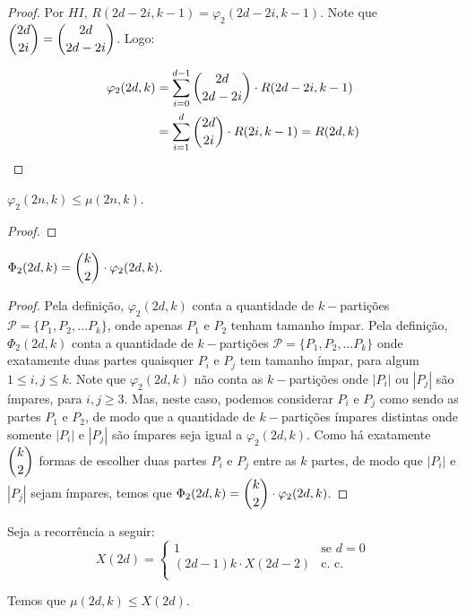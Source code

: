 \documentclass[12pt]{article}
\begin{document}
\begin{proof}
  	Por $HI$, $R(2d - 2i, k-1) = \varphi_2(2d - 2i, k-1)$. Note que $\escolhe{2d}{2i} = \escolhe{2d}{2d - 2i} $. Logo:
  	
  	\begin{align}
  		\begin{split}
  			\varphi_2(2d, k) &= \sum\limits_{i = 0}^{d-1}\escolhe{2d}{2d - 2i} \cdot R(2d - 2i, k-1)\\
  			&= \sum\limits_{i = 1}^{d}\escolhe{2d}{2i} \cdot R(2i, k-1) = R(2d, k)
  		\end{split} 
  	\end{align}  
  	
  	\end{proof} \newl
  
   \begin{lema}  
  	\label{lema4} 
  	$\varphi_2(2n, k) \leq \mu(2n, k)$.
  \end{lema}
  
  \begin{proof} 
  	
  \end{proof} \newpage

  
  \begin{lema}  
  	\label{lema5} 
  	$\Phi_2(2d, k) = \escolhe{k}{2} \cdot \varphi_2(2d, k)$.
  \end{lema}
  
  \begin{proof}
  	Pela definição, $\varphi_2(2d, k)$ conta a quantidade de $k-$partições $\mathcal{P} = \{ P_1, P_2, \ldots P_k \}$, onde apenas $P_1$ e $P_2$ tenham tamanho ímpar. Pela definição, $\Phi_2(2d, k)$ conta a quantidade de $k-$partições $\mathcal{P} = \{ P_1, P_2, \ldots P_k \}$ onde exatamente duas partes quaisquer $P_i$ e $P_j$ tem tamanho ímpar, para algum $1 \leq i, j \leq k$. Note que $\varphi_2(2d, k)$ não conta as $k-$partições onde $|P_i|$ ou $|P_j|$ são ímpares, para $i, j \geq 3$. Mas, neste caso, podemos considerar $P_i$ e $P_j$ como sendo as partes $P_1$ e $P_2$, de modo que a quantidade de $k-$partições ímpares distintas onde somente $|P_i|$ e $|P_j|$ são ímpares seja igual a $\varphi_2(2d, k)$. Como há exatamente $\escolhe{k}{2}$ formas de escolher duas partes $P_i$ e $P_j$ entre as $k$ partes, de modo que $|P_i|$ e $|P_j|$ sejam ímpares, temos que $\Phi_2(2d, k) = \escolhe{k}{2} \cdot \varphi_2(2d, k)$.
  	
  \end{proof}\newl
  
    
  \begin{lema}  
  	\label{lema6} 
  	Seja a recorrência a seguir: \\
  	
  	\begin{equation}
  		X(2d) =
  		\begin{cases}
  			1 & \text{se $d = 0$}\\
  			(2d - 1) k \cdot X(2d - 2) & \text{c. c.} \\ 
  		\end{cases}
  	\end{equation}
  	
  	Temos que $\mu(2d, k) \leq X(2d)$.
  \end{lema}
  
\end{document}
